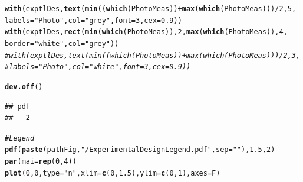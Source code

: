 \documentclass[11pt, oneside]{article}\usepackage[]{graphicx}\usepackage[]{color}
\makeatletter
\newcommand{\hlnum}[1]{\textcolor[rgb]{0.686,0.059,0.569}{#1}}%
\newcommand{\hlstr}[1]{\textcolor[rgb]{0.192,0.494,0.8}{#1}}%
\newcommand{\hlcom}[1]{\textcolor[rgb]{0.678,0.584,0.686}{\textit{#1}}}%
\newcommand{\hlopt}[1]{\textcolor[rgb]{0,0,0}{#1}}%
\newcommand{\hlstd}[1]{\textcolor[rgb]{0.345,0.345,0.345}{#1}}%
\newcommand{\hlkwc}[1]{\textcolor[rgb]{0.333,0.667,0.333}{#1}}%
\newcommand{\hlkwd}[1]{\textcolor[rgb]{0.737,0.353,0.396}{\textbf{#1}}}%
\newenvironment{kframe}{%
 \def\at@end@of@kframe{}%
 \ifinner\ifhmode%
  \def\at@end@of@kframe{\end{minipage}}%
  \begin{minipage}{\columnwidth}%
 \fi\fi%
 \def\FrameCommand##1{\hskip\@totalleftmargin \hskip-\fboxsep
 \colorbox{shadecolor}{##1}\hskip-\fboxsep
     \hskip-\linewidth \hskip-\@totalleftmargin \hskip\columnwidth}%
 \MakeFramed {\advance\hsize-\width
   \@totalleftmargin\z@ \linewidth\hsize
   \@setminipage}}%
 {\par\unskip\endMakeFramed%
 \at@end@of@kframe}
\newenvironment{knitrout}{}{} %
\makeatother
\begin{document}
\begin{knitrout}
\begin{kframe}
\begin{alltt}
\hlkwd{with}\hlstd{(exptlDes,} \hlkwd{text}\hlstd{(}\hlkwd{min}\hlstd{((}\hlkwd{which}\hlstd{(PhotoMeas))} \hlopt{+} \hlkwd{max}\hlstd{(}\hlkwd{which}\hlstd{(PhotoMeas)))} \hlopt{/} \hlnum{2}\hlstd{,} \hlnum{5}\hlstd{,}
        \hlkwc{labels} \hlstd{=} \hlstr{"Photo"}\hlstd{,} \hlkwc{col} \hlstd{=} \hlstr{"grey"}\hlstd{,} \hlkwc{font} \hlstd{=} \hlnum{3}\hlstd{,} \hlkwc{cex} \hlstd{=} \hlnum{0.9}\hlstd{))}
\hlkwd{with}\hlstd{(exptlDes,} \hlkwd{rect}\hlstd{(}\hlkwd{min}\hlstd{(}\hlkwd{which}\hlstd{(PhotoMeas)),} \hlnum{2}\hlstd{,} \hlkwd{max}\hlstd{(}\hlkwd{which}\hlstd{(PhotoMeas)),} \hlnum{4}\hlstd{,}
        \hlkwc{border} \hlstd{=} \hlstr{"white"}\hlstd{,} \hlkwc{col} \hlstd{=} \hlstr{"grey"}\hlstd{))}
\hlcom{#with(exptlDes, text(min((which(PhotoMeas)) + max(which(PhotoMeas))) / 2, 3, }
\hlcom{#	labels = "Photo", col = "white", font = 3, cex = 0.9))}

\hlkwd{dev.off}\hlstd{()}
\end{alltt}
\begin{verbatim}
## pdf 
##   2
\end{verbatim}
\begin{alltt}
\hlcom{# Legend}
\hlkwd{pdf}\hlstd{(}\hlkwd{paste}\hlstd{(pathFig,} \hlstr{"/ExperimentalDesignLegend.pdf"}\hlstd{,} \hlkwc{sep} \hlstd{=} \hlstr{""}\hlstd{),} \hlnum{1.5}\hlstd{,} \hlnum{2}\hlstd{)}
\hlkwd{par}\hlstd{(}\hlkwc{mai} \hlstd{=} \hlkwd{rep}\hlstd{(}\hlnum{0}\hlstd{,} \hlnum{4}\hlstd{))}
\hlkwd{plot}\hlstd{(}\hlnum{0}\hlstd{,} \hlnum{0}\hlstd{,} \hlkwc{type} \hlstd{=} \hlstr{"n"}\hlstd{,} \hlkwc{xlim} \hlstd{=} \hlkwd{c}\hlstd{(}\hlnum{0}\hlstd{,} \hlnum{1.5}\hlstd{),} \hlkwc{ylim} \hlstd{=} \hlkwd{c}\hlstd{(}\hlnum{0}\hlstd{,} \hlnum{1}\hlstd{),} \hlkwc{axes} \hlstd{= F)}


\end{alltt}
\end{kframe}
\end{knitrout}
\end{document}
